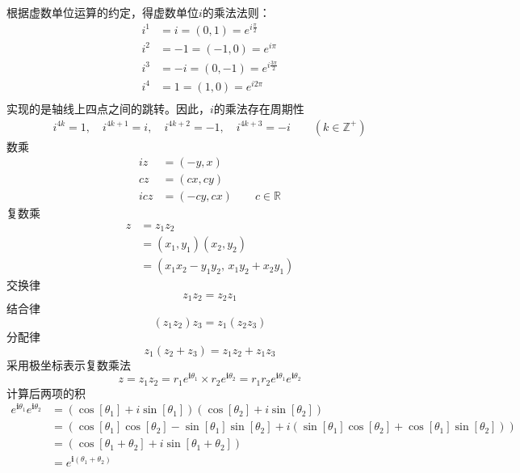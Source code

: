 根据虚数单位运算的约定，得虚数单位$i$的乘法法则：
\[\begin{aligned}
     {i}^1 &= i = (0,1) = e^{i \frac{\pi}{2}}\\
    {i}^2 &= -1 = (-1,0)= e^{i \pi} \\
     {i}^3 &= -i = (0,-1) = e^{i \frac{3\pi}{2}} \\
    {i}^4 &= 1 = (1,0) = e^{i 2\pi }\\ 
\end{aligned} \]
实现的是轴线上四点之间的跳转。因此，$i$的乘法存在周期性
\begin{equation}\label{}
    \begin{aligned}
     i^{4 k}=1,\quad 
     i^{4 k+1}=i,\quad 
     i^{4 k+2}=-1 ,\quad 
     i^{4 k+3}=-i  \qquad (k \in \mathbb{Z}^+)
\end{aligned} 
\end{equation}
数乘
\begin{equation}\label{}
    \begin{aligned}
    i z &= (-y, x) \\
    c z &= (cx, cy)  \\
    ic z &= (-cy, cx) \qquad c \in \mathbb{R}
\end{aligned} 
\end{equation}
复数乘
\begin{equation}\label{}
    \begin{aligned}
    z &= z_1 z_2  \\ 
    &= (x_1, y_1) (x_2,y_2) \\
    &= (x_1x_2- y_1y_2,\,  x_1y_2+x_2y_1) 
   \end{aligned}  
\end{equation}
   交换律
   \[ z_1 z_2  = z_2 z_1 \]
   结合律
   \[ (z_1 z_2)z_3  = z_1 (z_2 z_3) \]
   分配律
   \[ z_1 (z_2 + z_3)  = z_1 z_2 + z_1 z_3\]
采用极坐标表示复数乘法
	\[z= z_1 z_2 = r_{1} e^{\boldsymbol{i}\theta_{1}} \times r_{2} e^{\boldsymbol{i}\theta_{2}} = r_{1} r_{2} e^{\boldsymbol{i}\theta_{1}} e^{\boldsymbol{i}\theta_{2}}\]
    计算后两项的积
    \[ \begin{aligned}
		e^{\boldsymbol{i}\theta_{1}} e^{\boldsymbol{i}\theta_{2}} &=
\left(\operatorname{cos}\left[\theta_{1}\right]+i \operatorname{sin}\left[\theta_{1}\right]\right)\left(\operatorname{cos}\left[\theta_{2}\right]+i \operatorname{sin}\left[\theta_{2}\right]\right) \\
		& =\left(\operatorname{cos}\left[\theta_{1}\right] \operatorname{cos}\left[\theta_{2}\right]-\operatorname{sin}\left[\theta_{1}\right] \operatorname{sin}\left[\theta_{2}\right]+i\left(\operatorname{sin}\left[\theta_{1}\right] \operatorname{cos}\left[\theta_{2}\right]+\operatorname{cos}\left[\theta_{1}\right] \operatorname{sin}\left[\theta_{2}\right]\right)\right) \\
		& =\left(\operatorname{cos}\left[\theta_{1}+\theta_{2}\right]+i \operatorname{sin}\left[\theta_{1}+\theta_{2}\right]\right) \\
		& = e^{\boldsymbol{i}\left(\theta_{1}+\theta_{2}\right)}
		\end{aligned} \]
